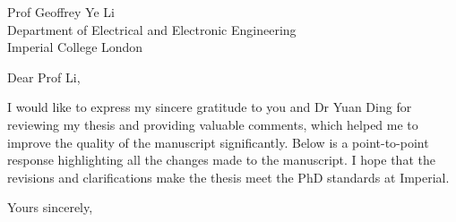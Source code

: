 \documentclass[10pt]{scrartcl}
\begin{document}

\begin{letter}{%
		Prof Geoffrey Ye Li\\
		Department of Electrical and Electronic Engineering\\
		Imperial College London
	}
	\opening{Dear Prof Li,}
	I would like to express my sincere gratitude to you and Dr Yuan Ding for reviewing my thesis and providing valuable comments, which helped me to improve the quality of the manuscript significantly.
	Below is a point-to-point response highlighting all the changes made to the manuscript.
	I hope that the revisions and clarifications make the thesis meet the PhD standards at Imperial.
	\closing{Yours sincerely,}
\end{letter}
\end{document}
